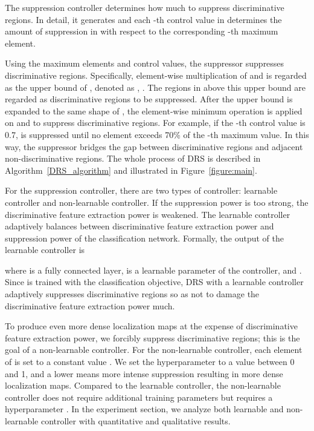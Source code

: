 \documentclass[letterpaper]{article} \usepackage{aaai21}  \usepackage{times}  \usepackage{helvet} \usepackage{courier}  \usepackage[hyphens]{url}  \usepackage{graphicx} \urlstyle{rm} \def\UrlFont{\rm}  \usepackage{natbib}  \usepackage{caption} \frenchspacing  \setlength{\pdfpagewidth}{8.5in}  \setlength{\pdfpageheight}{11in}
\begin{document}
The suppression controller determines how much to suppress discriminative regions.
In detail, it generates  and each -th control value in  determines the amount of suppression in  with respect to the corresponding -th maximum element.

Using the  maximum elements and  control values, the suppressor suppresses discriminative regions. Specifically, element-wise multiplication of  and  is regarded as the upper bound of , denoted as , .
The regions in  above this upper bound are regarded as discriminative regions to be suppressed. After the upper bound  is expanded to the same shape of , the element-wise minimum operation is applied on  and  to suppress discriminative regions. 
For example, if the -th control value is 0.7,  is suppressed until no element exceeds 70\% of the -th maximum value.
In this way, the suppressor bridges the gap between discriminative regions and adjacent non-discriminative regions.
The whole process of DRS is described in Algorithm~\ref{DRS_algorithm} and illustrated in Figure~\ref{figure:main}.

For the suppression controller, there are two types of controller: learnable controller and non-learnable controller.
If the suppression power is too strong, the discriminative feature extraction power is weakened.
The learnable controller adaptively balances between discriminative feature extraction power and suppression power of the classification network. 
Formally, the output of the learnable controller is

where  is a fully connected layer,  is a learnable parameter of the controller, and .
Since  is trained with the classification objective, DRS with a learnable controller adaptively suppresses 
discriminative regions so as not to damage the discriminative feature extraction power much.

To produce even more dense localization maps at the expense of discriminative feature extraction power, we forcibly suppress discriminative regions; this is the goal of a non-learnable controller.
For the non-learnable controller, each element of  is set to a constant value .
We set the hyperparameter  to a value between 0 and 1, and a lower  means more intense suppression resulting in more dense localization maps.
Compared to the learnable controller, the non-learnable controller does not require additional training parameters but requires a hyperparameter .
In the experiment section, we analyze both learnable and non-learnable controller with quantitative and qualitative results.
\end{document}
